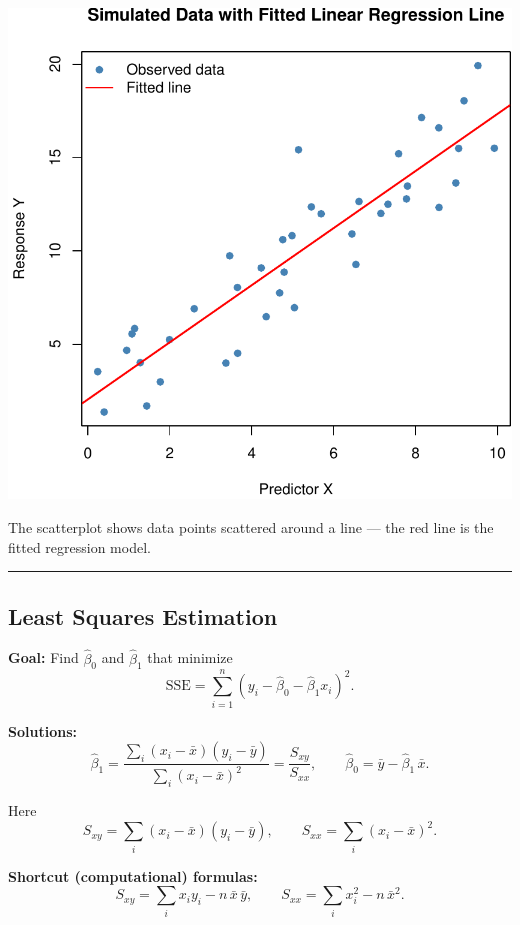 \documentclass[
  letterpaper,
]{scrbook}
\begin{document}
\includegraphics{unit2-slr/slr_files/figure-pdf/unnamed-chunk-2-1.pdf}

The scatterplot shows data points scattered around a line --- the red
line is the fitted regression model.

\begin{center}\rule{0.5\linewidth}{0.5pt}\end{center}

\subsection{Least Squares Estimation}\label{least-squares-estimation}

\textbf{Goal:} Find \(\hat\beta_0\) and \(\hat\beta_1\) that minimize \[
\mathrm{SSE} = \sum_{i=1}^n (y_i - \hat\beta_0 - \hat\beta_1 x_i)^2.
\]

\textbf{Solutions:} \[
\hat\beta_1 = \frac{\sum_i (x_i - \bar x)(y_i - \bar y)}{\sum_i (x_i - \bar x)^2}
= \frac{S_{xy}}{S_{xx}},
\qquad
\hat\beta_0 = \bar y - \hat\beta_1\,\bar x.
\]

Here \[
S_{xy} = \sum_i (x_i - \bar x)(y_i - \bar y),
\qquad
S_{xx} = \sum_i (x_i - \bar x)^2.
\]

\textbf{Shortcut (computational) formulas:} \[
S_{xy} = \sum_i x_i y_i - n\,\bar x\,\bar y,
\qquad
S_{xx} = \sum_i x_i^2 - n\,\bar x^2.
\]
\end{document}
